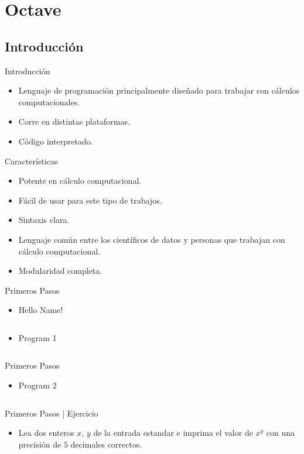 \documentclass[usenames, dvipsnames, compress]{beamer}
\begin{document}
	\section{Octave}
	\subsection{Introducción}
	\begin{frame}{Introducción}
	\begin{itemize}[<+- | alert@ +>]
		\item Lenguaje de programación principalmente diseñado para trabajar con cálculos computacionales.
		\item Corre en distintas plataformas.
		\item Código interpretado.
	\end{itemize}
	\end{frame}
	\begin{frame}{Características}
	\begin{itemize}[<+- | alert@+>]
		\item Potente en cálculo computacional.
		\item Fácil de usar para este tipo de trabajos.
		\item Sintaxis clara.
		\item Lenguaje común entre los científicos de datos y personas que trabajan con cálculo computacional.
		\item Modularidad completa.
	\end{itemize}
	\end{frame}
	\begin{frame}{Primeros Pasos}
		\begin{itemize}
			\item [] \begin{block}{Hello Name!}
			\inputminted[xleftmargin=\parindent,linenos]{octave}{codes/hello.m}
		\end{block}
		\pause
		\item [] \begin{block}{Program 1}
			\inputminted[xleftmargin=\parindent,linenos]{python}{codes/program1.m}
			\end{block}
		\end{itemize}
	\end{frame}
	\begin{frame}{Primeros Pasos}
		\begin{itemize}
			\item []
			\begin{block}{Program 2}
				\inputminted[xleftmargin=\parindent,linenos]{python}{codes/program2.m}
			\end{block}
		\end{itemize}
	\end{frame}
	\begin{frame}{Primeros Pasos | Ejercicio}
			\begin{itemize}
				\item Lea dos enteros $x$, $y$ de la entrada estandar e imprima el valor de $x^y$ con una precisión de $5$ decimales correctos.
			\end{itemize}
		\end{frame}
\end{document}
